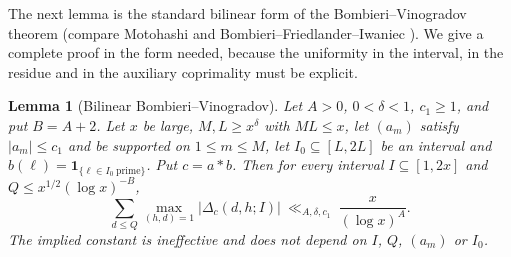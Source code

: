 \documentclass[final,11pt]{elsarticle}
\newtheorem{lemma}[theorem]{Lemma}
\theoremstyle{definition}
\theoremstyle{remark}
\newcommand{\one}{\mathbf1}
\numberwithin{equation}{section}
\begin{document}
The next lemma is the standard bilinear form of the Bombieri--Vinogradov
theorem (compare Motohashi \cite{Motohashi76} and
Bombieri--Friedlander--Iwaniec \cite[Theorem~0]{BFI86}). We give a complete
proof in the form needed, because the uniformity in the interval, in the
residue and in the auxiliary coprimality must be explicit.

\begin{lemma}[Bilinear Bombieri--Vinogradov]\label{sp:lem:BBV}
Let $A>0$, $0<\delta<1$, $c_1\ge1$, and put $B=A+2$. Let $x$ be large,
$M,L\ge x^\delta$ with $ML\le x$, let $(a_m)$ satisfy $|a_m|\le c_1$ and be
supported on $1\le m\le M$, let $I_0\subseteq[L,2L]$ be an interval and
$b(\ell)=\one_{\{\ell\in I_0\ \mathrm{prime}\}}$. Put $c=a*b$. Then for every
interval $I\subseteq[1,2x]$ and $Q\le x^{1/2}(\log x)^{-B}$,
\[
 \sum_{d\le Q}\max_{(h,d)=1}|\Delta_c(d,h;I)|\ \ll_{A,\delta,c_1}\ \frac{x}{(\log x)^A}.
\]
The implied constant is ineffective and does not depend on $I$, $Q$, $(a_m)$
or $I_0$.
\end{lemma}
\end{document}
